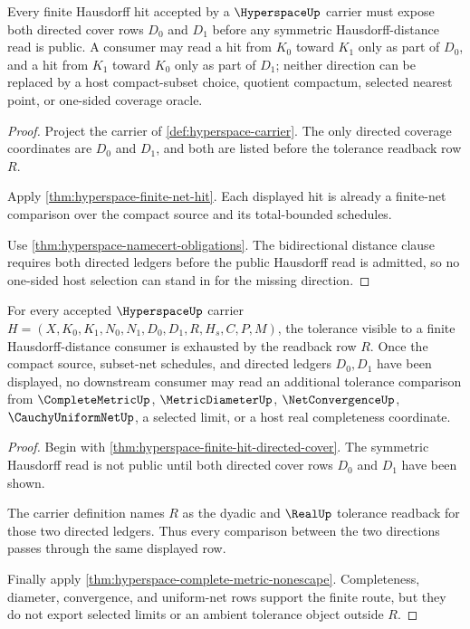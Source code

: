 \begin{theorem}
\label{thm:hyperspace-finite-hit-directed-cover}
Every finite Hausdorff hit accepted by a $\HyperspaceUp$ carrier must expose both directed cover rows $D_0$ and $D_1$ before any symmetric Hausdorff-distance read is public. A consumer may read a hit from $K_0$ toward $K_1$ only as part of $D_0$, and a hit from $K_1$ toward $K_0$ only as part of $D_1$; neither direction can be replaced by a host compact-subset choice, quotient compactum, selected nearest point, or one-sided coverage oracle.
\end{theorem}
\begin{proof}
Project the carrier of \autoref{def:hyperspace-carrier}. The only directed coverage coordinates are $D_0$ and $D_1$, and both are listed before the tolerance readback row $R$.

Apply \autoref{thm:hyperspace-finite-net-hit}. Each displayed hit is already a finite-net comparison over the compact source and its total-bounded schedules.

Use \autoref{thm:hyperspace-namecert-obligations}. The bidirectional distance clause requires both directed ledgers before the public Hausdorff read is admitted, so no one-sided host selection can stand in for the missing direction.
\end{proof}

\begin{theorem}
\label{thm:hyperspace-tolerance-readback-exhaustion}
For every accepted $\HyperspaceUp$ carrier $H=(X,K_0,K_1,N_0,N_1,D_0,D_1,R,H_s,C,P,M)$, the tolerance visible to a finite Hausdorff-distance consumer is exhausted by the readback row $R$. Once the compact source, subset-net schedules, and directed ledgers $D_0,D_1$ have been displayed, no downstream consumer may read an additional tolerance comparison from $\CompleteMetricUp$, $\MetricDiameterUp$, $\NetConvergenceUp$, $\CauchyUniformNetUp$, a selected limit, or a host real completeness coordinate.
\end{theorem}
\begin{proof}
Begin with \autoref{thm:hyperspace-finite-hit-directed-cover}. The symmetric Hausdorff read is not public until both directed cover rows $D_0$ and $D_1$ have been shown.

The carrier definition names $R$ as the dyadic and $\RealUp$ tolerance readback for those two directed ledgers. Thus every comparison between the two directions passes through the same displayed row.

Finally apply \autoref{thm:hyperspace-complete-metric-nonescape}. Completeness, diameter, convergence, and uniform-net rows support the finite route, but they do not export selected limits or an ambient tolerance object outside $R$.
\end{proof}

